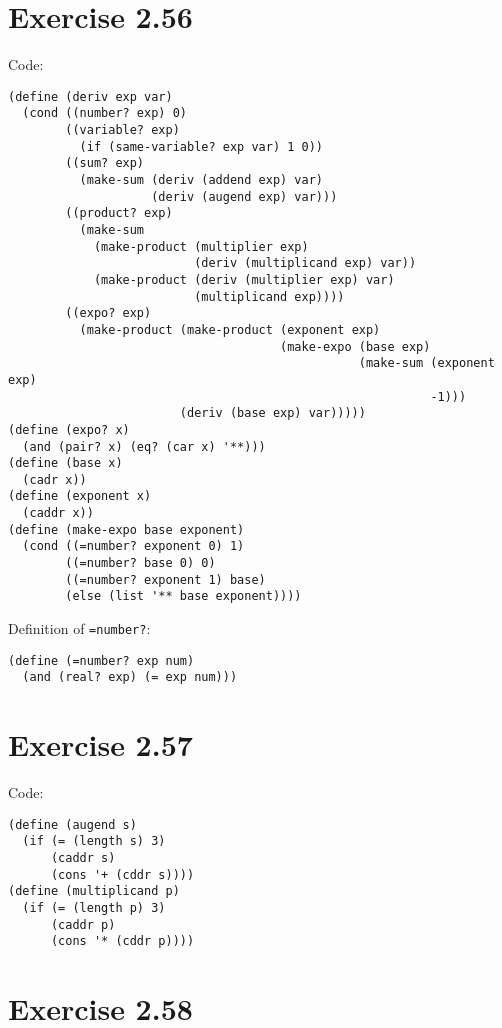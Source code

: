 \documentclass[../main.tex]{subfiles}
\begin{document}
\section{Exercise 2.56}

Code:

\begin{lstlisting}
(define (deriv exp var)
  (cond ((number? exp) 0)
        ((variable? exp)
          (if (same-variable? exp var) 1 0))
        ((sum? exp)
          (make-sum (deriv (addend exp) var)
                    (deriv (augend exp) var)))
        ((product? exp)
          (make-sum
            (make-product (multiplier exp)
                          (deriv (multiplicand exp) var))
            (make-product (deriv (multiplier exp) var)
                          (multiplicand exp))))
        ((expo? exp)
          (make-product (make-product (exponent exp)
                                      (make-expo (base exp)
                                                 (make-sum (exponent exp)
                                                           -1)))
                        (deriv (base exp) var)))))
(define (expo? x)
  (and (pair? x) (eq? (car x) '**)))
(define (base x)
  (cadr x))
(define (exponent x)
  (caddr x))
(define (make-expo base exponent)
  (cond ((=number? exponent 0) 1)
        ((=number? base 0) 0)
        ((=number? exponent 1) base)
        (else (list '** base exponent))))
\end{lstlisting}

Definition of \lstinline{=number?}:

\begin{lstlisting}
(define (=number? exp num)
  (and (real? exp) (= exp num)))
\end{lstlisting}

\section{Exercise 2.57}

Code:

\begin{lstlisting}
(define (augend s)
  (if (= (length s) 3)
      (caddr s)
      (cons '+ (cddr s))))
(define (multiplicand p)
  (if (= (length p) 3)
      (caddr p)
      (cons '* (cddr p))))
\end{lstlisting}

\section{Exercise 2.58}
\end{document}
